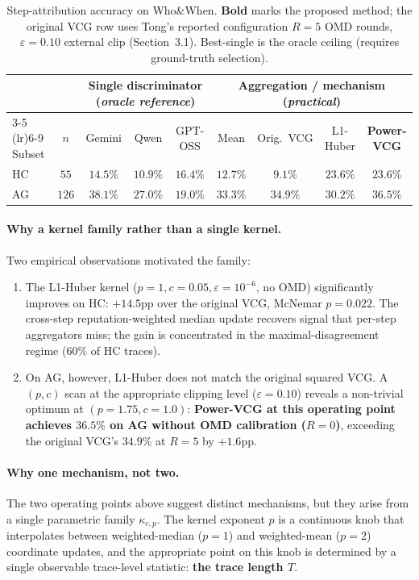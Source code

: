 \documentclass[11pt]{article}
\begin{document}
\begin{table}[h]
\centering
\small
\caption{Step-attribution accuracy on Who\&When. \textbf{Bold} marks the
proposed method; the original VCG row uses Tong's reported configuration
$R = 5$ OMD rounds, $\varepsilon = 0.10$ external clip (Section~3.1).
Best-single is the oracle ceiling (requires ground-truth selection).}
\label{tab:summary-positive}
\setlength{\tabcolsep}{4pt}
\begin{tabular}{lcccccccc}
\toprule
& & \multicolumn{3}{c}{Single discriminator (\emph{oracle reference})} & \multicolumn{4}{c}{Aggregation / mechanism (\emph{practical})} \\
\cmidrule(lr){3-5} \cmidrule(lr){6-9}
Subset & $n$ & Gemini & Qwen & GPT-OSS & Mean & Orig.~VCG & L1-Huber & \textbf{Power-VCG} \\
\midrule
HC & $55$  & $14.5\%$ & $10.9\%$ & $16.4\%$ & $12.7\%$ & $9.1\%$  & $23.6\%$ & $\mathbf{23.6\%}$ \\
AG & $126$ & $38.1\%$ & $27.0\%$ & $19.0\%$ & $33.3\%$ & $34.9\%$ & $30.2\%$ & $\mathbf{36.5\%}$ \\
\bottomrule
\end{tabular}
\end{table}

\paragraph{Why a kernel family rather than a single kernel.}
Two empirical observations motivated the family:
\begin{enumerate}[nosep, leftmargin=*]
\item The L1-Huber kernel ($p = 1, c = 0.05, \varepsilon = 10^{-6}$, no
OMD) significantly improves on HC: $+14.5$pp over the original VCG, McNemar
$p = 0.022$. The cross-step reputation-weighted median update recovers
signal that per-step aggregators miss; the gain is concentrated in the
maximal-disagreement regime ($60\%$ of HC traces).
\item On AG, however, L1-Huber does not match the original squared VCG.
A $(p, c)$ scan at the appropriate clipping level ($\varepsilon = 0.10$)
reveals a non-trivial optimum at $(p = 1.75, c = 1.0)$: \textbf{Power-VCG
at this operating point achieves $36.5\%$ on AG without OMD calibration
($R = 0$)}, exceeding the original VCG's $34.9\%$ at $R = 5$ by $+1.6$pp.
\end{enumerate}

\paragraph{Why one mechanism, not two.}
The two operating points above suggest distinct mechanisms, but they
arise from a single parametric family $\kappa_{c, p}$. The kernel exponent
$p$ is a continuous knob that interpolates between weighted-median
($p = 1$) and weighted-mean ($p = 2$) coordinate updates, and the
appropriate point on this knob is determined by a single observable
trace-level statistic: \textbf{the trace length $T$}.
\end{document}
